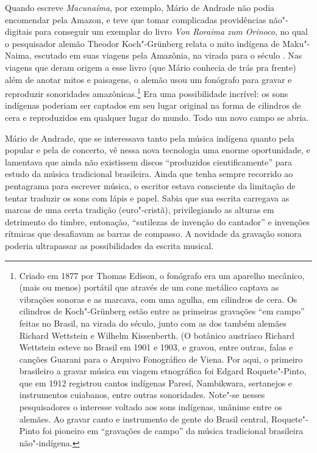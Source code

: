 Quando escreve \emph{Macunaíma}, por exemplo, Mário de Andrade não podia
encomendar pela Amazon, e teve que tomar complicadas providências
não"-digitais para conseguir um exemplar do livro \emph{Von Roraima zum
Orinoco}, no qual o pesquisador alemão Theodor Koch"-Grünberg relata o
mito indígena de Maku"-Naima, escutado em suas viagens pela Amazônia, na
virada para o século . Nas viagens que deram origem a esse livro (que
Mário conhecia de trás pra frente) além de anotar mitos e paisagens, o
alemão usou um fonógrafo para gravar e reproduzir sonoridades
amazônicas.\footnote{Criado em 1877 por Thomas Edison, o fonógrafo era
  um aparelho mecânico, (mais ou menos) portátil que através de um cone
  metálico captava as vibrações sonoras e as marcava, com uma agulha, em
  cilindros de cera. Os cilindros de Koch"-Grünberg estão entre as
  primeiras gravações ``em campo'' feitas no Brasil, na virada do
  século, junto com as dos também alemães Richard Wettstein e Wilhelm
  Kissenberth. (O botânico austríaco Richard Wettstein esteve no Brasil
  em 1901 e 1903, e gravou, entre outras, falas e canções Guarani para o
  Arquivo Fonográfico de Viena. Por aqui, o primeiro brasileiro a gravar
  música em viagem etnográfica foi Edgard Roquete"-Pinto, que em 1912
  registrou cantos indígenas Paresí, Nambikwara, sertanejos e
  instrumentos cuiabanos, entre outras sonoridades. Note"-se nesses
  pesquisadores o interesse voltado aos sons indígenas, unânime entre os
  alemães. Ao gravar canto e instrumento de gente do Brasil central,
  Roquete"-Pinto foi pioneiro em ``gravações de campo'' da música
  tradicional brasileira não"-indígena.} Era uma possibilidade incrível:
os sons indígenas poderiam ser captados em seu lugar original na forma
de cilindros de cera e reproduzidos em qualquer lugar do mundo. Todo um
novo campo se abria.

Mário de Andrade, que se interessava tanto pela música indígena quanto
pela popular e pela de concerto, vê nessa nova tecnologia uma enorme
oportunidade, e lamentava que ainda não existissem discos ``produzidos
cientificamente'' para estudo da música tradicional brasileira. Ainda
que tenha sempre recorrido ao pentagrama para escrever música, o
escritor estava consciente da limitação de tentar traduzir os sons com
lápis e papel. Sabia que sua escrita carregava as marcas de uma certa
tradição (euro"-cristã), privilegiando as alturas em detrimento do
timbre, entonação, ``sutilezas de invenção do cantador'' e invenções
rítmicas que desafiavam as barras de compasso. A novidade da gravação
sonora poderia ultrapassar as possibilidades da escrita musical.

